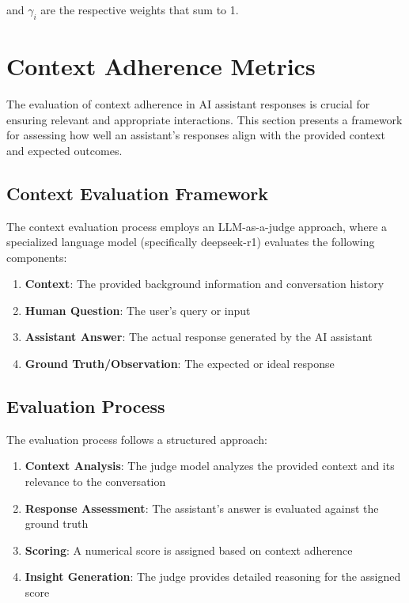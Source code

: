 \documentclass[12pt]{article}
\begin{document}
and $\gamma_i$ are the respective weights that sum to 1.

\section{Context Adherence Metrics}

The evaluation of context adherence in AI assistant responses is crucial for ensuring relevant and appropriate interactions. This section presents a framework for assessing how well an assistant's responses align with the provided context and expected outcomes.

\subsection{Context Evaluation Framework}

The context evaluation process employs an LLM-as-a-judge approach, where a specialized language model (specifically deepseek-r1) evaluates the following components:

\begin{enumerate}
    \item \textbf{Context}: The provided background information and conversation history
    \item \textbf{Human Question}: The user's query or input
    \item \textbf{Assistant Answer}: The actual response generated by the AI assistant
    \item \textbf{Ground Truth/Observation}: The expected or ideal response
\end{enumerate}

\subsection{Evaluation Process}

The evaluation process follows a structured approach:

\begin{enumerate}
    \item \textbf{Context Analysis}: The judge model analyzes the provided context and its relevance to the conversation
    \item \textbf{Response Assessment}: The assistant's answer is evaluated against the ground truth
    \item \textbf{Scoring}: A numerical score is assigned based on context adherence
    \item \textbf{Insight Generation}: The judge provides detailed reasoning for the assigned score
\end{enumerate}
\end{document}
